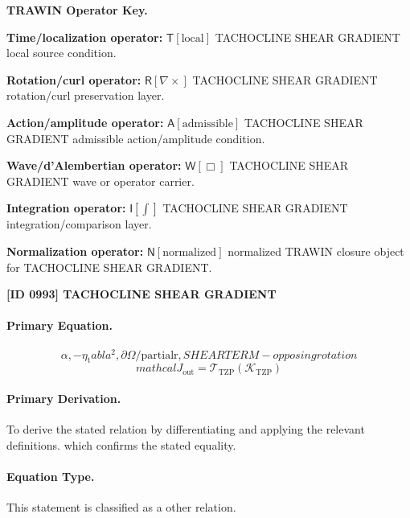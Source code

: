\par\vspace{0.45\baselineskip}
\noindent\begin{minipage}[t]{\linewidth}
\begingroup
\small
\raggedright
\textbf{TRAWIN Operator Key.}\par
\noindent\textbf{Time/localization operator:} $\mathsf{T}\!\left[\mathrm{local}\right]$ TACHOCLINE SHEAR GRADIENT local source condition.\par
\noindent\textbf{Rotation/curl operator:} $\mathsf{R}\!\left[\nabla\times\right]$ TACHOCLINE SHEAR GRADIENT rotation/curl preservation layer.\par
\noindent\textbf{Action/amplitude operator:} $\mathsf{A}\!\left[\mathrm{admissible}\right]$ TACHOCLINE SHEAR GRADIENT admissible action/amplitude condition.\par
\noindent\textbf{Wave/d'Alembertian operator:} $\mathsf{W}\!\left[\Box\right]$ TACHOCLINE SHEAR GRADIENT wave or operator carrier.\par
\noindent\textbf{Integration operator:} $\mathsf{I}\!\left[\int\right]$ TACHOCLINE SHEAR GRADIENT integration/comparison layer.\par
\noindent\textbf{Normalization operator:} $\mathsf{N}\!\left[\mathrm{normalized}\right]$ normalized TRAWIN closure object for TACHOCLINE SHEAR GRADIENT.\par
\endgroup
\end{minipage}

\clearpage
\noindent\textbf{[ID 0993] TACHOCLINE SHEAR GRADIENT}\par
\vspace{0.35em}
\paragraph{Primary Equation.}
\[
{\alpha, -\eta_{\mathrm{t}}  abla^{2}, \partial\Omega/\mathrm{partialr}}, SHEAR TERM - opposing rotation
\]
\[
mathcal{J}_{\mathrm{out}} = \mathcal{T}_{\mathrm{TZP}}\!\left(\mathcal{K}_{\mathrm{TZP}}\right)
\]

\paragraph{Primary Derivation.}
To derive the stated relation by differentiating and applying the relevant definitions. which confirms the stated equality.
\paragraph{Equation Type.}
This statement is classified as a other relation.


